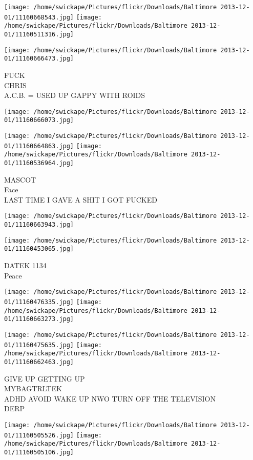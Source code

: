 \documentclass[10pt,letterpaper]{article}
\begin{document}
\texttt{[image: /home/swickape/Pictures/flickr/Downloads/Baltimore 2013-12-01/11160668543.jpg]}
\texttt{[image: /home/swickape/Pictures/flickr/Downloads/Baltimore 2013-12-01/11160511316.jpg]}

\texttt{[image: /home/swickape/Pictures/flickr/Downloads/Baltimore 2013-12-01/11160666473.jpg]}

FUCK\\
CHRIS\\
A.C.B. = USED UP GAPPY WITH ROIDS
\pagebreak

\texttt{[image: /home/swickape/Pictures/flickr/Downloads/Baltimore 2013-12-01/11160666073.jpg]}

\vspace{0.25in}
\texttt{[image: /home/swickape/Pictures/flickr/Downloads/Baltimore 2013-12-01/11160664863.jpg]}
\texttt{[image: /home/swickape/Pictures/flickr/Downloads/Baltimore 2013-12-01/11160536964.jpg]}

MASCOT\\
Face\\
LAST TIME I GAVE A SHIT I GOT FUCKED
\pagebreak

\texttt{[image: /home/swickape/Pictures/flickr/Downloads/Baltimore 2013-12-01/11160663943.jpg]}

\vspace{0.25in}
\texttt{[image: /home/swickape/Pictures/flickr/Downloads/Baltimore 2013-12-01/11160453065.jpg]}

DATEK 1134\\
Peace
\pagebreak

\texttt{[image: /home/swickape/Pictures/flickr/Downloads/Baltimore 2013-12-01/11160476335.jpg]}
\texttt{[image: /home/swickape/Pictures/flickr/Downloads/Baltimore 2013-12-01/11160663273.jpg]}

\texttt{[image: /home/swickape/Pictures/flickr/Downloads/Baltimore 2013-12-01/11160475635.jpg]}
\texttt{[image: /home/swickape/Pictures/flickr/Downloads/Baltimore 2013-12-01/11160662463.jpg]}

GIVE UP GETTING UP\\
MYBAGTRLTEK\\
ADHD AVOID WAKE UP NWO TURN OFF THE TELEVISION\\
DERP
\pagebreak

\texttt{[image: /home/swickape/Pictures/flickr/Downloads/Baltimore 2013-12-01/11160505526.jpg]}
\texttt{[image: /home/swickape/Pictures/flickr/Downloads/Baltimore 2013-12-01/11160505106.jpg]}
\end{document}
